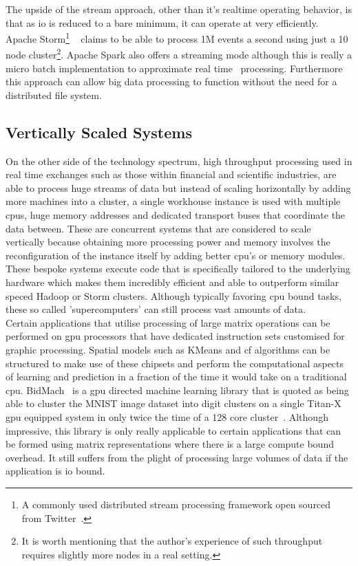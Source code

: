 \documentclass[a4paper,11pt]{scrreprt}
\begin{document}
The upside of the stream approach, other than it's realtime operating behavior, is that as \acrshort{io} is reduced to a bare minimum, it can operate at very efficiently. Apache Storm\footnote{A commonly used distributed stream processing framework open sourced from Twitter~\cite{storm-twitter}.} ~\cite{storm-site} claims to be able to process 1M events a second using just a 10 node cluster\footnote{It is worth mentioning that the author's experience of such throughput requires slightly more nodes in a real setting.}. Apache Spark also offers a streaming mode although this is really a micro batch implementation to approximate real time~\cite{spark-streaming-paper} processing. Furthermore this approach can allow big data processing to function without the need for a distributed file system. 

\subsection{Vertically Scaled Systems}
On the other side of the technology spectrum, high throughput processing used in real time exchanges such as those within financial and scientific industries, are able to process huge streams of data but instead of scaling horizontally by adding more machines into a cluster, a single workhouse instance is used with multiple \acrshort{cpu}s, huge memory addresses and dedicated transport buses that coordinate the data between. These are concurrent systems that are considered to scale vertically because obtaining more processing power and memory involves the reconfiguration of the instance itself by adding better \acrshort{cpu}'s or memory modules. These bespoke systems execute code that is specifically tailored to the underlying hardware which makes them incredibly efficient and able to outperform similar speced Hadoop or Storm clusters. Although typically favoring \acrshort{cpu} bound tasks, these so called 'supercomputers' can still process vast amounts of data.\\

Certain applications that utilise processing of large matrix operations can be performed on \acrshort{gpu} processors that have dedicated instruction sets customised for graphic processing. Spatial models such as KMeans and \acrshort{cf} algorithms can be structured to make use of these chipsets and perform the computational aspects of learning and prediction in a fraction of the time it would take on a traditional \acrshort{cpu}. BidMach~\cite{bidmach} is a \acrshort{gpu} directed machine learning library that is quoted as being able to cluster the MNIST image dataset into digit clusters on a single Titan-X \acrshort{gpu} equipped system in only twice the time of a 128 core cluster~\cite{bidmachbench}. Although impressive, this library is only really applicable to certain applications that can be formed using matrix representations where there is a large compute bound overhead. It still suffers from the plight of processing large volumes of data if the application is \acrshort{io} bound.
\end{document}
